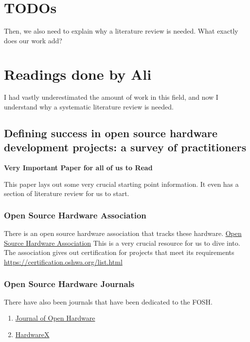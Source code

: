\documentclass{article}
\begin{document}
\section{TODOs}



Then, we also need to explain why a literature review is needed.
What exactly does our work add?

\section{Readings done by Ali}

I had vastly underestimated the amount of work in this field, and now I understand why a systematic literature review is needed.

\subsection{Defining success in open source hardware development projects: a survey of practitioners}
\cite{p1_def_succ}

\textbf{Very Important Paper for all of us to Read}

This paper lays out some very crucial starting point information.
It even has a section of literature review for us to start.

\subsubsection{Open Source Hardware Association}
There is an open source hardware association that tracks these hardware.
\href{https://www.oshwa.org}{Open Source Hardware Association}
This is a very crucial resource for us to dive into. 
The association gives out certification for projects that meet its requirements
\href{https://certification.oshwa.org/list.html}{https://certification.oshwa.org/list.html}

\subsubsection{Open Source Hardware Journals}
There have also been journals that have been dedicated to the FOSH.
\begin{enumerate}
    \item \href{https://openhardware.metajnl.com/}{Journal of Open Hardware}
    \item \href{https://www.sciencedirect.com/journal/hardwarex}{HardwareX}
\end{enumerate}
\end{document}

